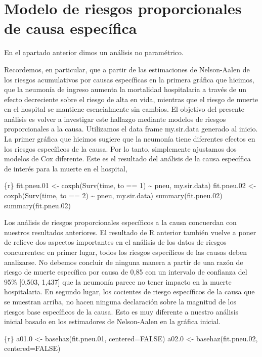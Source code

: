 \documentclass[
]{article}
\begin{document}
\hypertarget{modelo-de-riesgos-proporcionales-de-causa-especuxedfica}{%
\section{Modelo de riesgos proporcionales de causa
específica}\label{modelo-de-riesgos-proporcionales-de-causa-especuxedfica}}

En el apartado anterior dimos un análisis no paramétrico.

Recordemos, en particular, que a partir de las estimaciones de
Nelson-Aalen de los riesgos acumulativos por causas específicas en la
primera gráfica que hicimos, que la neumonía de ingreso aumenta la
mortalidad hospitalaria a través de un efecto decreciente sobre el
riesgo de alta en vida, mientras que el riesgo de muerte en el hospital
se mantiene esencialmente sin cambios. El objetivo del presente análisis
es volver a investigar este hallazgo mediante modelos de riesgos
proporcionales a la causa. Utilizamos el data frame my.sir.data generado
al inicio. La primer gráfica que hicimos sugiere que la neumonía tiene
diferentes efectos en los riesgos específicos de la causa. Por lo tanto,
simplemente ajustamos dos modelos de Cox diferente. Este es el resultado
del análisis de la causa específica de interés para la muerte en el
hospital,

\{r\} fit.pneu.01 \textless- coxph(Surv(time, to == 1) \textasciitilde{}
pneu, my.sir.data) fit.pneu.02 \textless- coxph(Surv(time, to == 2)
\textasciitilde{} pneu, my.sir.data) summary(fit.pneu.02)
summary(fit.pneu.02)

Los análisis de riesgos proporcionales específicos a la causa concuerdan
con nuestros resultados anteriores. El resultado de R anterior también
vuelve a poner de relieve dos aspectos importantes en el análisis de los
datos de riesgos concurrentes: en primer lugar, todos los riesgos
específicos de las causas deben analizarse. No debemos concluir de
ninguna manera a partir de una razón de riesgo de muerte específica por
causa de 0,85 con un intervalo de confianza del 95\% {[}0,503, 1,437{]}
que la neumonía parece no tener impacto en la muerte hospitalaria. En
segundo lugar, los cocientes de riesgo específicos de la causa que se
muestran arriba, no hacen ninguna declaración sobre la magnitud de los
riesgos base específicos de la causa. Esto es muy diferente a nuestro
análisis inicial basado en los estimadores de Nelson-Aalen en la gráfica
inicial.

\{r\} a01.0 \textless- basehaz(fit.pneu.01, centered=FALSE) a02.0
\textless- basehaz(fit.pneu.02, centered=FALSE)
\end{document}
